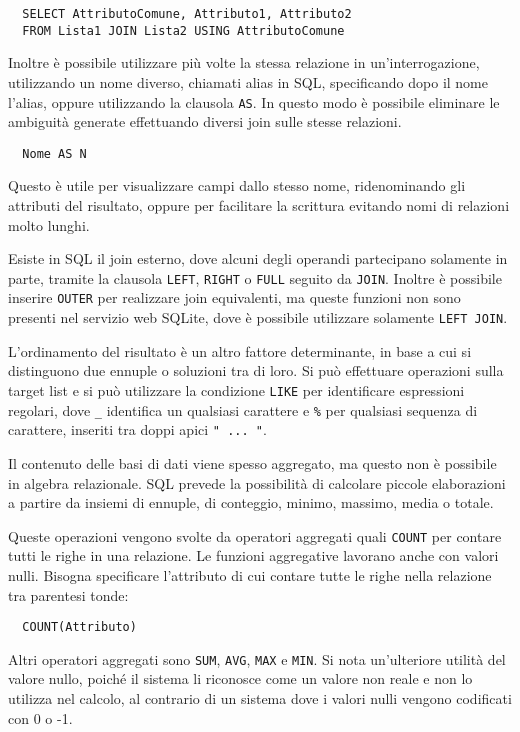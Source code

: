 \documentclass{article}
\numberwithin{equation}{subsection}
\begin{document}
\begin{verbatim}
  SELECT AttributoComune, Attributo1, Attributo2
  FROM Lista1 JOIN Lista2 USING AttributoComune
\end{verbatim}

Inoltre è possibile utilizzare più volte la stessa relazione in un'interrogazione, utilizzando un nome diverso, chiamati alias in SQL, specificando dopo il nome 
l'alias, oppure utilizzando la clausola \verb|AS|. In questo modo è possibile eliminare le ambiguità generate effettuando diversi join sulle stesse relazioni. 
\begin{verbatim}
  Nome AS N
\end{verbatim}

Questo è utile per visualizzare campi dallo stesso nome, ridenominando gli attributi del risultato, oppure per facilitare la scrittura 
evitando nomi di relazioni molto lunghi. 

Esiste in SQL il join esterno, dove alcuni degli operandi partecipano solamente in parte, tramite la clausola \verb|LEFT|, \verb|RIGHT| o \verb|FULL| 
seguito da \verb|JOIN|. Inoltre è possibile inserire \verb|OUTER| per realizzare join equivalenti, ma queste funzioni non sono presenti nel servizio web SQLite, dove 
è possibile utilizzare solamente \verb|LEFT JOIN|. 

L'ordinamento del risultato è un altro fattore determinante, in base a cui si distinguono due ennuple 
o soluzioni tra di loro. Si può effettuare operazioni sulla target list e si può utilizzare la condizione \verb|LIKE| per identificare espressioni regolari, dove 
\verb|_| identifica un qualsiasi carattere e \verb|%| per qualsiasi sequenza di carattere, inseriti tra doppi apici \verb|" ... "|. 

Il contenuto delle basi di dati viene spesso aggregato, ma questo non è possibile in algebra relazionale. SQL prevede la possibilità di calcolare piccole elaborazioni 
a partire da insiemi di ennuple, di conteggio, minimo, massimo, media o totale. 

Queste operazioni vengono svolte da operatori aggregati quali \verb|COUNT| per contare tutti le righe in una relazione. Le funzioni aggregative 
lavorano anche con valori nulli. Bisogna specificare l'attributo di cui contare tutte le righe nella relazione tra parentesi tonde:
\begin{verbatim}
  COUNT(Attributo)
\end{verbatim}
Altri operatori aggregati sono \verb|SUM|, \verb|AVG|, \verb|MAX| e \verb|MIN|. Si nota un'ulteriore utilità del valore nullo, poiché il sistema li 
riconosce come un valore non reale e non lo utilizza nel calcolo, al contrario di un sistema dove i valori nulli vengono codificati con 0 o -1. 
\end{document}
